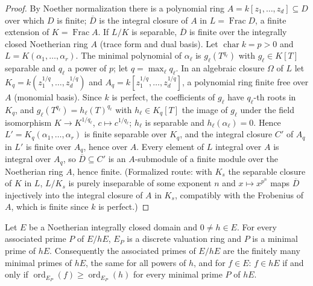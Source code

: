 \begin{proof}
By Noether normalization there is a polynomial ring $A=k[z_1,\dots,z_d]\subseteq D$ over which $D$ is finite;
$\overline D$ is the integral closure of $A$ in $L=\operatorname{Frac}D$, a finite extension of
$K=\operatorname{Frac}A$. If $L/K$ is separable, $\overline D$ is finite over the integrally closed Noetherian
ring $A$ (trace form and dual basis). Let $\operatorname{char}k=p>0$ and $L=K(\alpha_1,\dots,\alpha_r)$. The
minimal polynomial of $\alpha_\ell$ is $g_\ell(T^{q_\ell})$ with $g_\ell\in K[T]$ separable and $q_\ell$ a power
of $p$; let $q=\max_\ell q_\ell$. In an algebraic closure $\Omega$ of $L$ let $K_q=k(z_1^{1/q},\dots,z_d^{1/q})$
and $A_q=k[z_1^{1/q},\dots,z_d^{1/q}]$, a polynomial ring finite free over $A$ (monomial basis). Since $k$ is
perfect, the coefficients of $g_\ell$ have $q_\ell$-th roots in $K_q$, and $g_\ell(T^{q_\ell})=h_\ell(T)^{q_\ell}$
with $h_\ell\in K_q[T]$ the image of $g_\ell$ under the field isomorphism $K\to K^{1/q_\ell}$,
$c\mapsto c^{1/q_\ell}$; $h_\ell$ is separable and $h_\ell(\alpha_\ell)=0$. Hence $L'=K_q(\alpha_1,\dots,\alpha_r)$ is
finite separable over $K_q$, and the integral closure $C'$ of $A_q$ in $L'$ is finite over $A_q$, hence over
$A$. Every element of $L$ integral over $A$ is integral over $A_q$, so $\overline D\subseteq C'$ is an
$A$-submodule of a finite module over the Noetherian ring $A$, hence finite.
(Formalized route: with $K_s$ the separable closure of $K$ in $L$, $L/K_s$ is purely inseparable of some exponent $n$ and $x\mapsto x^{p^n}$ maps $\overline D$ injectively into the integral closure of $A$ in $K_s$, compatibly with the Frobenius of $A$, which is finite since $k$ is perfect.)
\end{proof}

\begin{lemma}\label{lem:bj-dvr-minimal}
\leanok
Let $E$ be a Noetherian integrally closed domain and $0\ne h\in E$. For every associated prime $P$ of
$E/hE$, $E_P$ is a discrete valuation ring and $P$ is a minimal prime of $hE$. Consequently the
associated primes of $E/hE$ are the finitely many minimal primes of $hE$, the same for all powers of $h$,
and for $f\in E$: $f\in hE$ if and only if $\operatorname{ord}_{E_P}(f)\ge\operatorname{ord}_{E_P}(h)$ for every minimal prime $P$ of $hE$.
\end{lemma}


